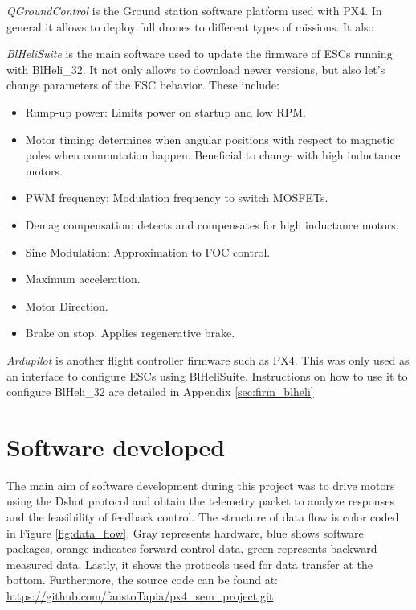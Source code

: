 \textit{QGroundControl} is the Ground station software platform used with PX4. In general it allows to deploy full drones to different types of missions. It also 
\newline

\textit{BlHeliSuite} is the main software used to update the firmware of ESCs running with BlHeli\_32. It not only allows to download newer versions, but also let's change parameters of the ESC behavior. These include:

\begin{itemize}
	\item Rump-up power: Limits power on startup and low RPM.
	\item Motor timing: determines when angular positions with respect to magnetic poles when commutation happen. Beneficial to change with high inductance motors.
	\item PWM frequency: Modulation frequency to switch MOSFETs.
	\item Demag compensation: detects and compensates for high inductance motors.
	\item Sine Modulation: Approximation to FOC control.
	\item Maximum acceleration.
	\item Motor Direction.
	\item Brake on stop. Applies regenerative brake.
\end{itemize}

\textit{Ardupilot} is another flight controller firmware such as PX4. This was only used as an interface to configure ESCs using BlHeliSuite. Instructions on how to use it to configure BlHeli\_32 are detailed in Appendix \ref{sec:firm_blheli}
\newline

\section{Software developed}
The main aim of software development during this project was to drive motors using the Dshot protocol and obtain the telemetry packet to analyze responses and the feasibility of feedback control. The structure of data flow is color coded in Figure \ref{fig:data_flow}. Gray represents hardware, blue shows software packages, orange indicates forward control data, green represents backward measured data. Lastly, it shows the protocols used for data transfer  at the bottom. Furthermore, the source code can be found at: \newline
\url{https://github.com/faustoTapia/px4_sem_project.git}.

